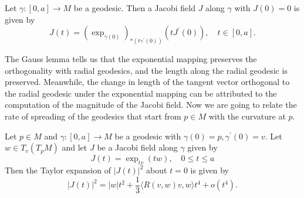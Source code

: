 \documentclass{ctexart}
\begin{document}
\begin{corollary}
  Let $\gamma:[0, a] \rightarrow M$ be a geodesic. Then a Jacobi field $J$ along $\gamma$ with $J(0)=0$ is given by
  $$
  J(t)=\left(\exp_{\gamma(0)}\right)_{*\left(t \gamma^{\prime}(0)\right)} \left(t J^{\prime}(0)\right), \quad t \in[0, a] .
  $$
\end{corollary}

The Gauss lemma tells us that the exponential mapping preserves the orthogonality with radial geodesics, and the length along the radial geodesic is preserved. 
Meanwhile, the change in length of the tangent vector orthogonal to the radial geodesic under the exponential mapping can be attributed to the computation of the magnitude of the Jacobi field.
Now we are going to relate the rate of spreading of the geodesics that start from $p \in M$ with the curvature at $p$. 
\begin{proposition}
  Let $p \in M$ and $\gamma:[0, a] \rightarrow M$ be a geodesic with $\gamma(0)=p, \gamma^{\prime}(0)=v$. Let $w \in T_v\left(T_p M\right)$ and let $J$ be a Jacobi field along $\gamma$ given by
  $$
  J(t)=\exp_{t v}(t w), \quad 0 \leq t \leq a
  $$
  Then the Taylor expansion of $|J(t)|^2$ about $t=0$ is given by
  $$
  |J(t)|^2=|w|t^2+\frac{1}{3}\langle R(v, w) v, w\rangle t^4+o(t^4).
  $$
\end{proposition}
\end{document}
